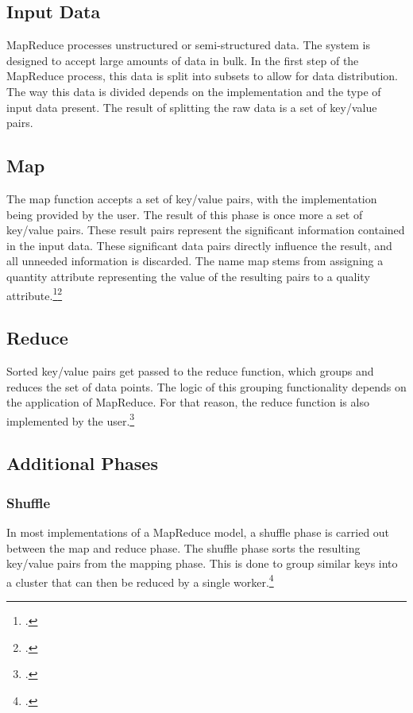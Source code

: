 \documentclass[12pt, letterpaper]{article}
\begin{document}
\subsection{Input Data}

MapReduce processes unstructured or semi-structured data. The system is designed to accept large amounts of data in bulk. In the first step of the MapReduce process, this data is split into subsets to allow for data distribution. The way this data is divided depends on the implementation and the type of input data present. The result of splitting the raw data is a set of key/value pairs.

\subsection{Map}

The map function accepts a set of key/value pairs, with the implementation being provided by the user. The result of this phase is once more a set of key/value pairs. These result pairs represent the significant information contained in the input data. These significant data pairs directly influence the result, and all unneeded information is discarded. The name map stems from assigning a quantity attribute representing the value of the resulting pairs to a quality attribute.\footcite{uniLeibzigMapReduce}\footcite{mapreducePaper}

\subsection{Reduce}

Sorted key/value pairs get passed to the reduce function, which groups and reduces the set of data points. The logic of this grouping functionality depends on the application of MapReduce. For that reason, the reduce function is also implemented by the user.\footcite{uniLeibzigMapReduce}

\pagebreak

\subsection{Additional Phases}

\subsubsection{Shuffle}
In most implementations of a MapReduce model, a shuffle phase is carried out between the map and reduce phase. The shuffle phase sorts the resulting key/value pairs from the mapping phase. This is done to group similar keys into a cluster that can then be reduced by a single worker.\footcite{uniLeibzigMapReduce}\newline
\end{document}
